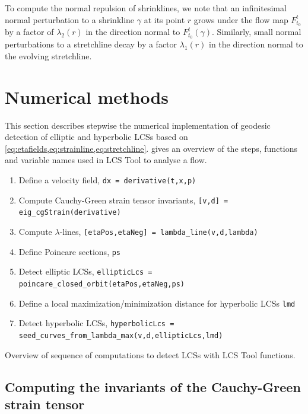 \documentclass{elsarticle}
\begin{document}
To compute the normal repulsion of shrinklines, we note that an infinitesimal
normal perturbation to a shrinkline $\gamma$ at its point $r$ grows under the flow map $F_{t_{0}}^{t}$ by a factor of $\lambda_{2}(r)$ in the direction normal to $F_{t_{0}}^{t}(\gamma).$ Similarly, small normal perturbations to a stretchline decay by a factor $\lambda_{1}(r)$ in the direction normal to the evolving stretchline. 

\section{Numerical methods}

This section describes stepwise the numerical implementation of geodesic detection of elliptic and hyperbolic LCSs based on \cref{eq:etafields,eq:strainline,eq:stretchline}.  gives an overview of the steps, functions and variable names used in LCS Tool to analyse a flow.

\begin{table}
\begin{enumerate}
\item Define a velocity field, \lstinline!dx = derivative(t,x,p)!
\item Compute Cauchy-Green strain tensor invariants, \lstinline![v,d] = eig_cgStrain(derivative)!
\item Compute $\lambda$-lines, \lstinline![etaPos,etaNeg] = lambda_line(v,d,lambda)!
\item Define Poincare sections, \lstinline!ps!
\item Detect elliptic LCSs, \lstinline!ellipticLcs = poincare_closed_orbit(etaPos,etaNeg,ps)!
\item Define a local maximization/minimization distance for hyperbolic LCSs \lstinline!lmd!
\item Detect hyperbolic LCSs, \lstinline!hyperbolicLcs = seed_curves_from_lambda_max(v,d,ellipticLcs,lmd)!
\end{enumerate}
\caption{Overview of sequence of computations to detect LCSs with LCS Tool functions.}
\label{t:LCS Tool overview}
\end{table}

\subsection{Computing the invariants of the Cauchy-Green strain tensor}
\end{document}
